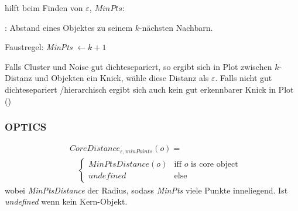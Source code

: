 \documentclass[10pt]{article} %
\begin{document}
\begin{definition} hilft beim Finden von $\varepsilon$, $\mathit{MinPts}$: 
      \begin{cptitemize} 
           \item {}: Abstand eines Objektes zu seinem $k$-nächsten Nachbarn.
           \item Faustregel: \textit{MinPts} $\gets k+1$
           \item Falls Cluster und Noise gut dichtesepariert, so ergibt sich in Plot zwischen $k$-Distanz und Objekten ein Knick, wähle diese Distanz als $\varepsilon$.
           \disadvantageit Falls nicht gut dichtesepariert /hierarchisch ergibt sich auch kein gut erkennbarer Knick in Plot ()
      \end{cptitemize} 
\end{definition} 

\subsubsection{OPTICS}


\begin{definition} 
     \begin{align*} 
          & \mathit{CoreDistance_{\varepsilon, \mathit{minPoints}}}(o) = \\
          & \hspace{1em} \begin{cases} 
              \mathit{MinPtsDistance}(o) & \text{iff $o$ is core object} \\
              \mathit{undefined} & \text{else}
          \end{cases} 
      \end{align*}  
      wobei \textit{MinPtsDistance} der Radius, sodass \textit{MinPts} viele Punkte inneliegend. Ist \textit{undefined} wenn kein Kern-Objekt.
\end{definition} 
\end{document}
